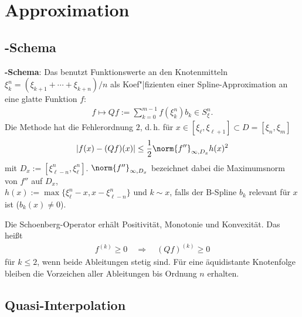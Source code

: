 \chapter{%
    Approximation%
}

\section{%
    -Schema%
}

\textbf{-Schema}:
Das  benutzt Funktionswerte an den Knotenmitteln
$\xi_k^n = (\xi_{k+1} + \dotsb + \xi_{k+n})/n$ als Koef"|fizienten einer Spline-Approximation
an eine glatte Funktion $f$:
\begin{align*}
    f \mapsto Qf := \sum_{k=0}^{m-1} f(\xi_k^n) b_k \in S_\xi^n.
\end{align*}
Die Methode hat die Fehlerordnung $2$, d.\,h. für
$x \in [\xi_\ell, \xi_{\ell+1}] \subset D = [\xi_n, \xi_m]$
\begin{align*}
    |f(x) - (Qf)(x)| \le \frac{1}{2} \norm{f''}_{\infty,D_x} h(x)^2
\end{align*}
mit $D_x := [\xi_{\ell-n}^n, \xi_\ell^n]$.
$\norm{f''}_{\infty,D_x}$ bezeichnet dabei die Maximumsnorm von $f''$ auf $D_x$,\\
$h(x) := \max\{\xi_\ell^n - x, x - \xi_{\ell-n}^n\}$ und $k \sim x$, falls
der B-Spline $b_k$ relevant für $x$ ist ($b_k(x) \not= 0$).

Die Schoenberg-Operator erhält Positivität, Monotonie und Konvexität.
Das heißt
\begin{align*}
    f^{(k)} \ge 0 \quad\Rightarrow\quad (Qf)^{(k)} \ge 0
\end{align*}
für $k \le 2$, wenn beide Ableitungen stetig sind.
Für eine äquidistante Knotenfolge bleiben die Vorzeichen
aller Ableitungen bis Ordnung $n$ erhalten.

\section{%
    Quasi-Interpolation%
}

